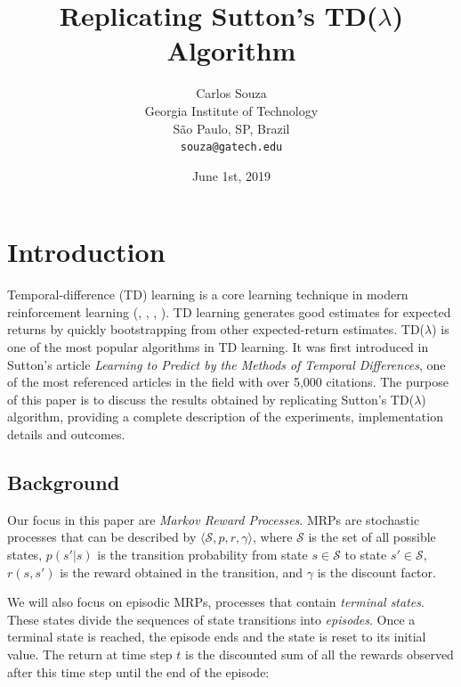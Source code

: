 \documentclass{article}
\title{Replicating Sutton's TD($\lambda$) Algorithm}
\date{June 1st, 2019}	%
\author{
  Carlos Souza\\
  Georgia Institute of Technology\\
  São Paulo, SP, Brazil \\
  \texttt{souza@gatech.edu} \\
}
\begin{document}
\maketitle

\begin{abstract}
\lipsum[1]
\end{abstract}




\section{Introduction}
\label{sec:introduction}
Temporal-difference (TD) learning is a core learning technique in modern reinforcement learning (\cite{Sutton1988}, \cite{Sutton:1998:IRL:551283}, \cite{KLMSurvey}, \cite{Szepesvari:2010:ARL:1855083}).
TD learning generates good estimates for expected returns by quickly bootstrapping from other expected-return estimates.
TD($\lambda$) is one of the most popular algorithms in TD learning.
It was first introduced in Sutton's article \emph{Learning to Predict by the Methods of Temporal Differences}, one of the most referenced articles in the field with over 5,000 citations.
The purpose of this paper is to discuss the results obtained by replicating Sutton's TD($\lambda$) algorithm, providing a complete description of the experiments, implementation details and outcomes.

\subsection{Background}
\label{subsec:background}
Our focus in this paper are \emph{Markov Reward Processes}.
MRPs are stochastic processes that can be described by \(\langle\mathcal{S}, p, r, \gamma\rangle\), where \(\mathcal{S}\) is the set of all possible states, \(p(s'|s)\) is the transition probability from state \(s \in \mathcal{S}\) to state \(s' \in \mathcal{S}\), \(r(s, s')\) is the reward obtained in the transition, and \(\gamma\) is the discount factor.

We will also focus on episodic MRPs, processes that contain \emph{terminal states}.
These states divide the sequences of state transitions into \emph{episodes}.
Once a terminal state is reached, the episode ends and the state is reset to its initial value.
The return at time step \(t\) is the discounted sum of all the rewards observed after this time step until the end of the episode:
\end{document}
